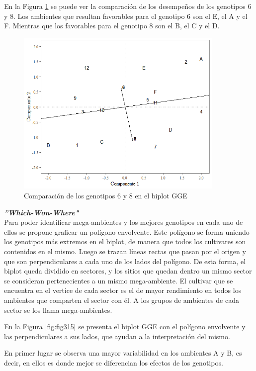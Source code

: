 En la Figura  \ref{fig:fig314} se puede ver la comparación de los desempeños de los genotipos 6 y 8. Los ambientes que resultan favorables para el genotipo 6 son el E, el A y el F. Mientras que los favorables para el genotipo 8 son el B, el C y el D.

\begin{figure}[h!]
	\begin{center}
		\includegraphics[width=10cm]{./Graficos/comp_gen_GGE.png}
	\end{center}
	\caption{Comparación de los genotipos 6 y 8 en el biplot GGE}
	\label{fig:fig314}
\end{figure}


\textbf{\emph{''Which-Won-Where"}}\\

Para poder identificar mega-ambientes y los mejores genotipos en cada uno de ellos se propone graficar un polígono envolvente. Este polígono se forma uniendo los genotipos más extremos en el biplot, de manera que todos los cultivares son contenidos en el mismo. Luego se trazan líneas rectas que pasan por el origen y que son perpendiculares a cada uno de los lados del polígono. De esta forma, el biplot queda dividido en sectores, y los sitios que quedan dentro un mismo sector se consideran pertenecientes a un mismo mega-ambiente. El cultivar que se encuentra en el vertice de cada sector es el de mayor rendimiento en todos los ambientes que comparten el sector con él. A los grupos de ambientes de cada sector se los llama mega-ambientes.

En la Figura \ref{fig:fig315} se presenta el biplot GGE con el polígono envolvente y las perpendiculares a sus lados, que ayudan a la interpretación del mismo.


En primer lugar se observa una mayor variabilidad en los ambientes A y B, es decir, en ellos es donde mejor se diferencian los efectos de los genotipos.


